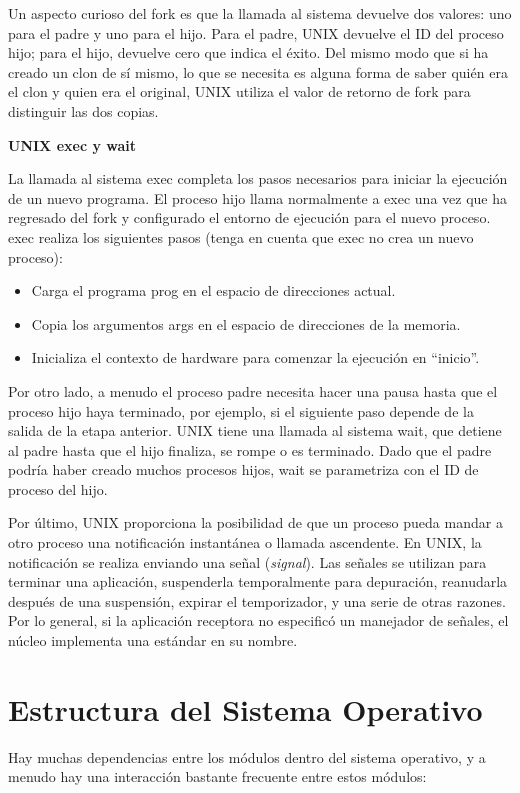 \documentclass[10pt]{book}
\begin{document}
Un aspecto curioso del {\mf fork} es que la llamada al sistema devuelve dos valores: uno para el padre y uno para el hijo. Para el padre, UNIX devuelve el ID del proceso hijo; para el hijo, devuelve cero que indica el éxito. Del mismo modo que si ha creado un clon de sí mismo, lo que se necesita es alguna forma de saber quién era el clon y quien era el original, UNIX utiliza el valor de retorno de {\mf fork} para distinguir las dos copias.

\textbf{UNIX {\mf exec} y {\mf wait}}

La llamada al sistema {\mf exec} completa los pasos necesarios para iniciar la ejecución de un nuevo programa. El proceso hijo llama normalmente a {\mf exec} una vez que ha regresado del {\mf fork} y configurado el entorno de ejecución para el nuevo proceso. {\mf exec} realiza los siguientes pasos (tenga en cuenta que {\mf exec} no crea un nuevo proceso):
\begin{itemize}
\item Carga el programa {\mf prog} en el espacio de direcciones actual.
\item Copia los argumentos {\mf args} en el espacio de direcciones de la memoria.
\item Inicializa el contexto de hardware para comenzar la ejecución en ``inicio''.
\end{itemize}

Por otro lado, a menudo el proceso padre necesita hacer una pausa hasta que el proceso hijo haya terminado, por ejemplo, si el siguiente paso depende de la salida de la etapa anterior. UNIX tiene una llamada al sistema {\mf wait}, que detiene al padre hasta que el hijo finaliza, se rompe o es terminado. Dado que el padre podría haber creado muchos procesos hijos, {\mf wait} se parametriza con el ID de proceso del hijo.

Por último, UNIX proporciona la posibilidad de que un proceso pueda mandar a otro proceso una notificación instantánea o llamada ascendente. En UNIX, la notificación se realiza enviando una señal (\textit{signal}). Las señales se utilizan para terminar una aplicación, suspenderla temporalmente para depuración, reanudarla después de una suspensión, expirar el temporizador, y una serie de otras razones. Por lo general, si la aplicación receptora no especificó un manejador de señales, el núcleo implementa una estándar en su nombre.

\section{Estructura del Sistema Operativo}
Hay muchas dependencias entre los módulos dentro del sistema operativo, y a menudo hay una interacción bastante frecuente entre estos módulos:
\end{document}
